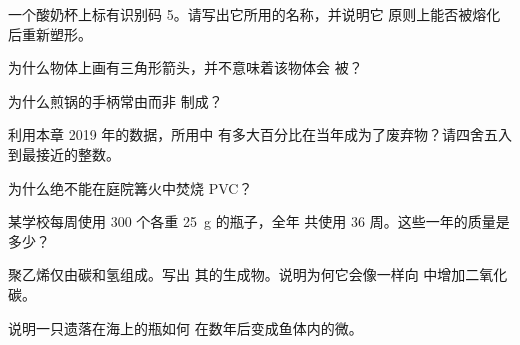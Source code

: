 \begin{exercise}[$\star\star$]\label{exo:g8:plastics:5}
一个酸奶杯上标有识别码 5。请写出它所用的名称，并说明它
原则上能否被熔化后重新塑形。
\end{exercise}

\begin{exercise}[$\star\star$]\label{exo:g8:plastics:6}
为什么物体上画有三角形箭头，并不意味着该物体会
被？
\end{exercise}

\begin{exercise}[$\star\star$]\label{exo:g8:plastics:7}
为什么煎锅的手柄常由而非
制成？
\end{exercise}

\begin{exercise}[$\star\star$]\label{exo:g8:plastics:8}
利用本章 2019 年的数据，所用中
有多大百分比在当年成为了废弃物？请四舍五入到最接近的整数。
\end{exercise}

\begin{exercise}[$\star\star$]\label{exo:g8:plastics:9}
为什么绝不能在庭院篝火中焚烧 PVC？
\end{exercise}

\begin{exercise}[$\star\star$]\label{exo:g8:plastics:10}
某学校每周使用 300 个各重 \qty{25}{g} 的瓶子，全年
共使用 36 周。这些一年的质量是多少？
\end{exercise}

\begin{exercise}[$\star\star\star$]\label{exo:g8:plastics:11}
聚乙烯仅由碳和氢组成。写出
其的生成物。说明为何它会像一样向
中增加二氧化碳。
\end{exercise}

\begin{exercise}[$\star\star\star$]\label{exo:g8:plastics:12}
说明一只遗落在海上的瓶如何
在数年后变成鱼体内的微。
\end{exercise}


